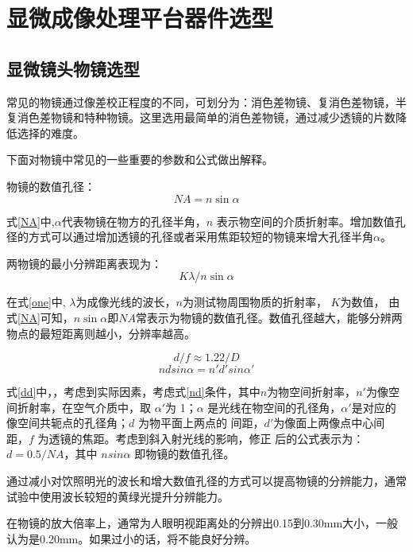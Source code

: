 \section{显微成像处理平台器件选型}
\subsection{显微镜头物镜选型}
常见的物镜通过像差校正程度的不同，可划分为：消色差物镜、复消色差物镜，半复消色差物镜和特种物镜。这里选用最简单的消色差物镜，通过减少透镜的片数降低选择的难度。

下面对物镜中常见的一些重要的参数和公式做出解释。

物镜的数值孔径：
\begin{equation}
\label{NA}
\mathit{NA} = n\sin \alpha 
\end{equation}

式\ref{NA}中,$\alpha$代表物镜在物方的孔径半角，$n$ 表示物空间的介质折射率。增加数值孔径的方式可以通过增加透镜的孔径或者采用焦距较短的物镜来增大孔径半角$\alpha$。

两物镜的最小分辨距离表现为：
\begin{equation}
\label{one}
\mathit{K}\lambda / n\sin \alpha 
\end{equation}

在式\ref{one}中, $\lambda$为成像光线的波长，$n$为测试物周围物质的折射率， $\mathit{K}$为数值， 由式\ref{NA}可知，$n\sin \alpha$即$\mathit{NA}$常表示为物镜的数值孔径。数值孔径越大，能够分辨两物点的最短距离则越小，分辨率越高。

\begin{equation}
\label{dd}
d/f \approx  1.22/D
\end{equation}
\begin{equation}
\label{nd}
ndsin \alpha=n'd'sin \alpha'
\end{equation}


式\ref{dd}中，，考虑到实际因素，考虑式\ref{nd}条件，其中$n$为物空间折射率，$n'$为像空间折射率，在空气介质中，取 $\alpha'$为 1；$\alpha$ 是光线在物空间的孔径角，$\alpha'$是对应的像空间共轭点的孔径角；$d$ 为物平面上两点的 间距，$d'$为像面上两像点中心间距，$f$ 为透镜的焦距。考虑到斜入射光线的影响，修正 后的公式表示为：$d=0.5/NA$，其中 $nsin\alpha$ 即物镜的数值孔径。 

通过减小对饮照明光的波长和增大数值孔径的方式可以提高物镜的分辨能力，通常试验中使用波长较短的黄绿光提升分辨能力。

在物镜的放大倍率上，通常为人眼明视距离处的分辨出0.15到0.30mm大小，一般认为是0.20mm。如果过小的话，将不能良好分辨。

